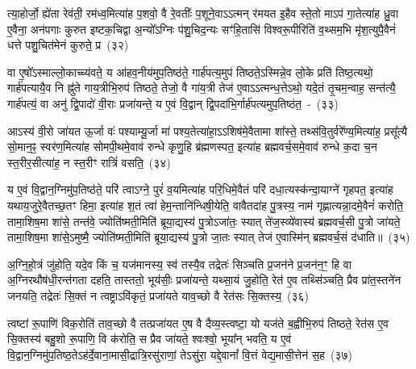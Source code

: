 त्या॒होर्जो॒ ह्ये॑ता रेव॑ती॒ रम॑ध्व॒मित्या॑ह प॒शवो॒ वै रे॒वतीः᳚ प॒शूने॒वा\-ऽऽ\-त्मन् र॑मयत इ॒हैव स्ते॒तो मा\-ऽप॑ गा॒तेत्या॑ह ध्रु॒वा ए॒वैना॒ अन॑पगाः कुरुत इष्टक॒चिद्वा अ॒न्यो᳚\-ऽग्निः प॑शु॒चिद॒न्यः सꣳ॑हि॒तासि॑ विश्वरू॒पीरिति॑ व॒थ्सम॒भि मृ॑श॒त्युपै॒वैनं॑ धत्ते पशु॒चित॑मेनं कुरुते॒ प्र~(३२)\ip

वा ए॒षो᳚\-ऽस्माल्लो॒काच्च्य॑वते॒ य आ॑हव॒नीय॑मुप॒तिष्ठ॑ते॒ गार्\mbox{}ह॑पत्य॒मुप॑ तिष्ठते॒\-ऽस्मिन्ने॒व लो॒के प्रति॑ तिष्ठ॒त्यथो॒ गार्\mbox{}ह॑पत्यायै॒व नि ह्नु॑ते गाय॒त्रीभि॒रुप॑ तिष्ठते॒ तेजो॒ वै गा॑य॒त्री तेज॑ ए॒वा\-ऽऽ\-त्मन्ध॒त्ते\-ऽथो॒ यदे॒तं तृ॒चम॒न्वाह॒ सन्त॑त्यै॒ गार्\mbox{}ह॑पत्यं॒ वा अनु॑ द्वि॒पादो॑ वी॒राः प्रजा॑यन्ते॒ य ए॒वं वि॒द्वान् द्वि॒पदा॑भि॒र्गार्\mbox{}ह॑पत्यमुप॒तिष्ठ॑त॒~-~(३३)\ip

आ\-ऽस्य॑ वी॒रो जा॑यत ऊ॒र्जा वः॑ पश्याम्यू॒र्जा मा॑ पश्य॒तेत्या॑हा॒\-ऽऽ\-शिष॑मे॒वैतामा शा᳚स्ते॒ तथ्स॑वि॒तुर्वरे᳚ण्य॒मित्या॑ह॒ प्रसू᳚त्यै सो॒मान॒ꣴ॒ स्वर॑ण॒मित्या॑ह सोमपी॒थमे॒वाव॑ रुन्धे कृणु॒हि ब्र॑ह्मणस्पत॒ इत्या॑ह ब्रह्मवर्च॒समे॒वाव॑ रुन्धे क॒दा च॒न स्त॒रीर॒सीत्या॑ह॒ न स्त॒रीꣳ रात्रिं॑ वसति॒~(३४)\ip

य ए॒वं वि॒द्वान॒ग्निमु॑प॒तिष्ठ॑ते॒ परि॑ त्वा\-ऽग्ने॒ पुरं॑ व॒यमित्या॑ह परि॒धिमे॒वैतं परि॑ दधा॒त्यस्क॑न्दा॒याग्ने॑ गृहपत॒ इत्या॑ह यथाय॒जुरे॒वैतच्छ॒तꣳ हिमा॒ इत्या॑ह श॒तं त्वा॑ हेम॒न्तानि॑न्धिषी॒\-येति॒ वावैतदा॑ह पु॒त्रस्य॒ नाम॑ गृह्णात्यन्ना॒दमे॒वैनं॑ करोति॒ तामा॒\-शिष॒मा शा॑से॒ तन्त॑वे॒ ज्योति॑ष्मती॒मिति॑ ब्रूया॒द्यस्य॑ पु॒त्रो\-ऽजा॑तः॒ स्यात् ते॑ज॒स्व्ये॑वास्य॑ ब्रह्मवर्च॒सी पु॒त्रो जा॑यते॒ तामा॒शिष॒मा शा॑से॒\-ऽमुष्मै॒ ज्योति॑ष्मती॒मिति॑ ब्रूया॒द्यस्य॑ पु॒त्रो जा॒तः स्यात् तेज॑ ए॒वास्मि॑न् ब्रह्मवर्च॒सं द॑धाति॥~(३५)\ip

{}

अ॒ग्नि॒हो॒त्रं जु॑होति॒ यदे॒व किं च॒ यज॑मानस्य॒ स्वं तस्यै॒व तद्रेतः॑ सिञ्चति प्र॒जन॑ने प्र॒जन॑न॒ꣳ॒ हि वा अ॒ग्निरथौष॑धी॒रन्त॑गता दहति॒ तास्ततो॒ भूय॑सीः॒ प्रजा॑यन्ते॒ यथ्सा॒यं जु॒होति॒ रेत॑ ए॒व तथ्सि॑ञ्चति॒ प्रैव प्रा॑त॒स्तने॑न जनयति॒ तद्रेतः॑ सि॒क्तं न त्वष्ट्रा\-ऽवि॑कृतं॒ प्रजा॑यते याव॒च्छो वै रेत॑सः सि॒क्तस्य॒~(३६)\ip

त्वष्टा॑ रू॒पाणि॑ विक॒रोति॑ ताव॒च्छो वै तत्प्रजा॑यत ए॒ष वै दैव्य॒स्त्वष्टा॒ यो यज॑ते ब॒ह्वीभि॒रुप॑ तिष्ठते॒ रेत॑स ए॒व सि॒क्तस्य॑ बहु॒शो रू॒पाणि॒ वि क॑रोति॒ स प्रैव जा॑यते॒ श्वःश्वो॒ भूया᳚न् भवति॒ य ए॒वं वि॒द्वान॒ग्निमु॑प॒तिष्ठ॒ते\-ऽह॑र्दे॒वाना॒\-मासी॒द्रात्रि॒रसु॑राणां॒ ते\-ऽसु॑रा॒ यद्दे॒वानां᳚ वि॒त्तं वेद्य॒मासी॒त्तेन॑ स॒ह~(३७)\ip


